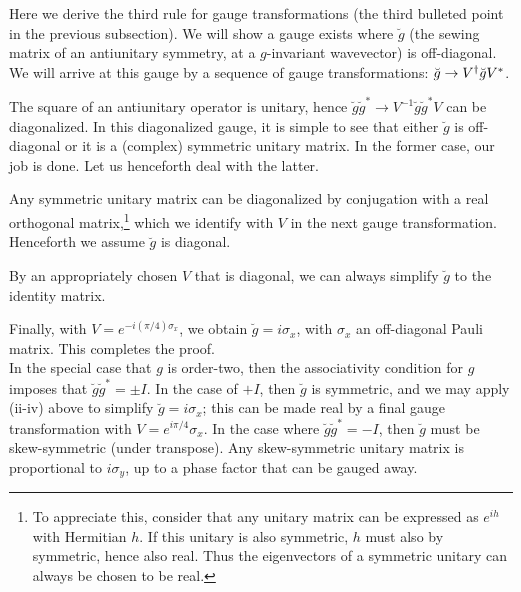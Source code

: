 \documentclass[aps, showpacs, twocolumn, notitlepage, superscriptaddress]{revtex4-1}
\begin{document}
Here we derive the third rule for gauge transformations (the third bulleted point in the previous subsection). We will show a gauge exists where $\breve{g}$ (the sewing matrix of an antiunitary symmetry, at a $g$-invariant wavevector) is off-diagonal. We will arrive at this gauge by a sequence of gauge transformations: $\breve{g}\rightarrow V^{\scriptstyle{\dagger}}\breve{g}V^*$.

 The square of an antiunitary operator is unitary, hence $\breve{g}\breve{g}^* \rightarrow V^{-1}\breve{g}\breve{g}^*V$ can be diagonalized. In this diagonalized gauge, it is simple to see that either $\breve{g}$ is off-diagonal or it is a (complex) symmetric unitary matrix. In the former case, our job is done. Let us henceforth deal with the latter.

 Any symmetric unitary matrix can be diagonalized by conjugation with a real orthogonal matrix,\footnote{To appreciate this, consider that any unitary matrix can be expressed as $e^{ih}$ with Hermitian $h$. If this unitary is also symmetric, $h$ must also by symmetric, hence also real. Thus the eigenvectors of a symmetric unitary can always be chosen to be real.} which we identify with $V$ in the next gauge transformation. Henceforth we assume $\breve{g}$ is diagonal. 

 By an appropriately chosen $V$ that is diagonal, we can always simplify $\breve{g}$ to the identity matrix.

 Finally, with $V=e^{-i(\pi/4)\sigma_x}$, we obtain $\breve{g}=i\sigma_x$, with $\sigma_x$ an off-diagonal Pauli matrix. This completes the proof.\\

In the special case that $g$ is order-two, then the associativity condition for $g$ imposes that $\breve{g}\breve{g}^*=\pm I$. In the case of $+I$, then $\breve{g}$ is symmetric, and we may apply (ii-iv) above to simplify $\breve{g}=i\sigma_x$; this can be made real by a final gauge transformation with $V=e^{i\pi/4}\sigma_x$. In the case where $\breve{g}\breve{g}^*=-I$, then $\breve{g}$ must be skew-symmetric (under transpose). Any skew-symmetric unitary matrix is proportional to $i\sigma_y$, up to a phase factor that can be gauged away.


\end{document}
